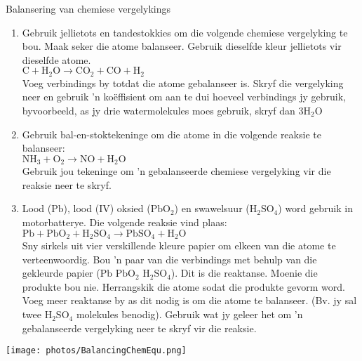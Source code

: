 \begin{activity}{Balansering van chemiese vergelykings}
\begin{enumerate}[noitemsep, label=\textbf{\arabic*}]
\item Gebruik jellietots en tandestokkies om die volgende chemiese vergelyking te bou. Maak seker die atome balanseer. Gebruik dieselfde kleur jellietots vir dieselfde atome.\\
$\text{C} + {\text{H}}_{2}\text{O} \to {\text{CO}}_{2} + {\text{CO}} + \text{H}_{2}$ \\
Voeg verbindings by totdat die atome gebalanseer is. Skryf die vergelyking neer en gebruik 'n ko\"{e}ffisient om aan te dui hoeveel verbindings jy gebruik, byvoorbeeld, as jy drie watermolekules moes gebruik, skryf dan $3{\text{H}}_{2}\text{O}$ 

\item Gebruik bal-en-stoktekeninge om die atome in die volgende reaksie te balanseer:\\
${\text{NH}}_{3} + {\text{O}}_{2} \to {\text{NO}} + \text{H}_{2}\text{O}$ \\
Gebruik jou tekeninge om 'n gebalanseerde chemiese vergelyking vir die reaksie neer te skryf.

\item Lood ($\text{Pb}$), lood (IV) oksied (${\text{PbO}}_{2}$) en swawelsuur  (${\text{H}}_{2}{\text{SO}}_{4}$) word gebruik in motorbatterye. Die volgende reaksie vind plaas:
$\text{Pb} + \text{PbO}_{2} + \text{H}_{2}\text{SO}_{4} \to {\text{PbSO}}_{4} + {\text{H}}_{2}\text{O}$ \\
Sny sirkels uit vier verskillende kleure papier om elkeen van die atome te verteenwoordig. Bou 'n paar van die verbindings met behulp van die gekleurde papier ($\text{Pb}$ $\text{PbO}_{2}$ $\text{H}_{2}\text{SO}_{4}$). Dit is die reaktanse. Moenie die produkte bou nie. Herrangskik die atome sodat die produkte gevorm word. Voeg meer reaktanse by as dit nodig is om die atome te balanseer. (Bv. jy sal twee $\text{H}_{2}\text{SO}_{4}$ molekules benodig). Gebruik wat jy geleer het om 'n gebalanseerde vergelyking neer te skryf vir die reaksie.
\end{enumerate}
 \begin{center}
\texttt{[image: photos/BalancingChemEqu.png]}\par
 \end{center}
\end{activity}
\par \label{m38726*uid10}
